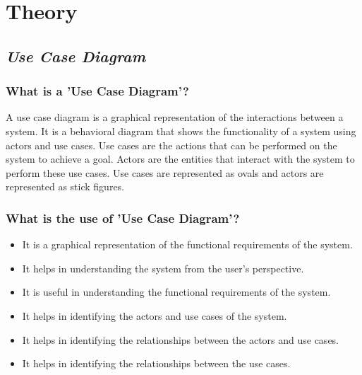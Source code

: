 \documentclass{article}
\begin{document}
\section{\textbf{Theory}}
\subsection{\textbf{\textit{Use Case Diagram}}}
\subsubsection{\textbf{What is a 'Use Case Diagram'?}}
A use case diagram is a graphical representation of the interactions between a system. It is a behavioral diagram that shows the functionality of a system using actors and use cases. Use cases are the actions that can be performed on the system to achieve a goal. Actors are the entities that interact with the system to perform these use cases. Use cases are represented as ovals and actors are represented as stick figures.\\

\subsubsection{\textbf{What is the use of 'Use Case Diagram'?}}
\begin{itemize}
	\item It is a graphical representation of the functional requirements of the system.
	\item It helps in understanding the system from the user’s perspective.
	\item It is useful in understanding the functional requirements of the system.
	\item  It helps in identifying the actors and use cases of the system.
	\item It helps in identifying the relationships between the actors and use cases.
	\item It helps in identifying the relationships between the use cases.
\end{itemize}
\end{document}
